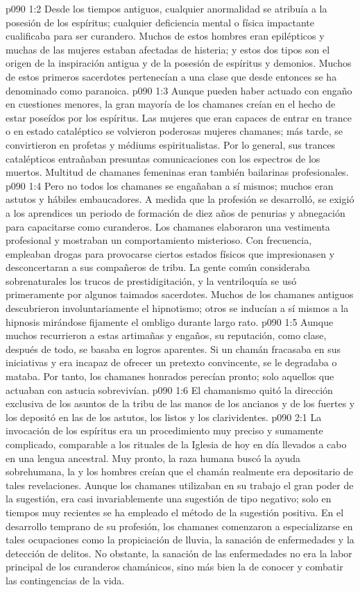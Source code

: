 \vs p090 1:2 Desde los tiempos antiguos, cualquier anormalidad se atribuía a la posesión de los espíritus; cualquier deficiencia mental o física impactante cualificaba para ser curandero. Muchos de estos hombres eran epilépticos y muchas de las mujeres estaban afectadas de histeria; y estos dos tipos son el origen de la inspiración antigua y de la posesión de espíritus y demonios. Muchos de estos primeros sacerdotes pertenecían a una clase que desde entonces se ha denominado como paranoica.
\vs p090 1:3 Aunque pueden haber actuado con engaño en cuestiones menores, la gran mayoría de los chamanes creían en el hecho de estar poseídos por los espíritus. Las mujeres que eran capaces de entrar en trance o en estado cataléptico se volvieron poderosas mujeres chamanes; más tarde, se convirtieron en profetas y médiums espiritualistas. Por lo general, sus trances catalépticos entrañaban presuntas comunicaciones con los espectros de los muertos. Multitud de chamanes femeninas eran también bailarinas profesionales.
\vs p090 1:4 Pero no todos los chamanes se engañaban a sí mismos; muchos eran astutos y hábiles embaucadores. A medida que la profesión se desarrolló, se exigió a los aprendices un periodo de formación de diez años de penurias y abnegación para capacitarse como curanderos. Los chamanes elaboraron una vestimenta profesional y mostraban un comportamiento misterioso. Con frecuencia, empleaban drogas para provocarse ciertos estados físicos que impresionasen y desconcertaran a sus compañeros de tribu. La gente común consideraba sobrenaturales los trucos de prestidigitación, y la ventriloquía se usó primeramente por algunos taimados sacerdotes. Muchos de los chamanes antiguos descubrieron involuntariamente el hipnotismo; otros se inducían a sí mismos a la hipnosis mirándose fijamente el ombligo durante largo rato.
\vs p090 1:5 Aunque muchos recurrieron a estas artimañas y engaños, su reputación, como clase, después de todo, se basaba en logros aparentes. Si un chamán fracasaba en sus iniciativas y era incapaz de ofrecer un pretexto convincente, se le degradaba o mataba. Por tanto, los chamanes honrados perecían pronto; solo aquellos que actuaban con astucia sobrevivían.
\vs p090 1:6 El chamanismo quitó la dirección exclusiva de los asuntos de la tribu de las manos de los ancianos y de los fuertes y los depositó en las de los astutos, los listos y los clarividentes.
\vs p090 2:1 La invocación de los espíritus era un procedimiento muy preciso y sumamente complicado, comparable a los rituales de la Iglesia de hoy en día llevados a cabo en una lengua ancestral. Muy pronto, la raza humana buscó la ayuda sobrehumana, la  y los hombres creían que el chamán realmente era depositario de tales revelaciones. Aunque los chamanes utilizaban en su trabajo el gran poder de la sugestión, era casi invariablemente una sugestión de tipo negativo; solo en tiempos muy recientes se ha empleado el método de la sugestión positiva. En el desarrollo temprano de su profesión, los chamanes comenzaron a especializarse en tales ocupaciones como la propiciación de lluvia, la sanación de enfermedades y la detección de delitos. No obstante, la sanación de las enfermedades no era la labor principal de los curanderos chamánicos, sino más bien la de conocer y combatir las contingencias de la vida.
